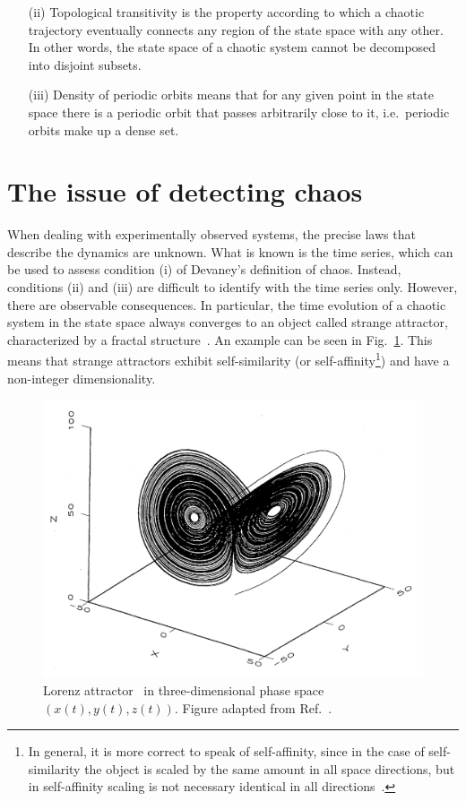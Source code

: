 \begin{itemize}
    \item[(ii)] Topological transitivity is the property according to which a chaotic trajectory eventually connects
    any region of the state space with any other. In other words, the state space of a chaotic system
    cannot be decomposed into disjoint subsets.

    \item[(iii)] Density of periodic orbits means that for any given point in the state space
    there is a periodic orbit that passes arbitrarily close to it, i.e.\ periodic orbits make up a dense set.

\end{itemize}


\section{The issue of detecting chaos}\label{sec: chaos in experiments}

When dealing with experimentally observed systems, the precise laws that describe the dynamics are unknown.
What is known is the time series, which can be used to assess condition (i) of Devaney's definition
of chaos. Instead, conditions (ii) and (iii) are difficult to identify with the time series only.
However, there are observable consequences. In particular, the time
evolution of a chaotic system in the state space always converges to an object called strange
attractor, characterized by a fractal structure~\cite{ref:fractal_dim,ref:fractal_book}.
An example can be seen in Fig.~\ref{fig: lorenz attractor}.
This means that strange
attractors exhibit self-similarity (or self-affinity\footnote{In general, it is more correct to speak
of self-affinity, since in the case of self-similarity the
object is scaled by the same amount in all space directions, but in self-affinity scaling is not
necessary identical in all directions~\cite{ref:mandelbrot_fractal}.}) and have a non-integer dimensionality.

\begin{figure}[!htbp]
\centering
\includegraphics[width=.6\linewidth]{images/lorenz_attractor.png}
\caption{
    Lorenz attractor~\cite{lorenz1963deterministic} in three-dimensional phase space
    $(x(t),y(t),z(t))$. Figure adapted from Ref.~\cite{ref:abarbanel_fourier_spectra}.
}\label{fig: lorenz attractor}
\end{figure}

